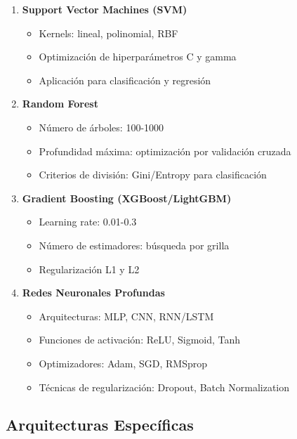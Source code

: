 \begin{enumerate}
    \item \textbf{Support Vector Machines (SVM)}
        \begin{itemize}
            \item Kernels: lineal, polinomial, RBF
            \item Optimización de hiperparámetros C y gamma
            \item Aplicación para clasificación y regresión
        \end{itemize}
    
    \item \textbf{Random Forest}
        \begin{itemize}
            \item Número de árboles: 100-1000
            \item Profundidad máxima: optimización por validación cruzada
            \item Criterios de división: Gini/Entropy para clasificación
        \end{itemize}
    
    \item \textbf{Gradient Boosting (XGBoost/LightGBM)}
        \begin{itemize}
            \item Learning rate: 0.01-0.3
            \item Número de estimadores: búsqueda por grilla
            \item Regularización L1 y L2
        \end{itemize}
    
    \item \textbf{Redes Neuronales Profundas}
        \begin{itemize}
            \item Arquitecturas: MLP, CNN, RNN/LSTM
            \item Funciones de activación: ReLU, Sigmoid, Tanh
            \item Optimizadores: Adam, SGD, RMSprop
            \item Técnicas de regularización: Dropout, Batch Normalization
        \end{itemize}
\end{enumerate}

\subsection{Arquitecturas Específicas}

